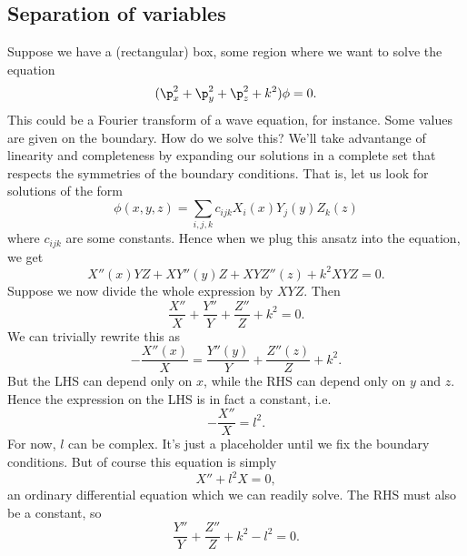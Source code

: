 \subsection*{Separation of variables}
\begin{exm}
    Suppose we have a (rectangular) box, some region where we want to solve the equation
    \begin{equation}
        (\p_x^2 + \p_y^2 + \p_z^2 + k^2)\phi =0.
    \end{equation}
    This could be a Fourier transform of a wave equation, for instance. Some values are given on the boundary. How do we solve this? We'll take advantange of linearity and completeness by expanding our solutions in a complete set that respects the symmetries of the boundary conditions. That is, let us look for  solutions of the form
    \begin{equation}
        \phi(x,y,z) = \sum_{i,j,k} c_{ijk} X_i(x) Y_j(y) Z_k(z)
    \end{equation}
    where $c_{ijk}$ are some constants. Hence when we plug this ansatz into the equation, we get
    \begin{equation}
        X''(x) YZ + XY''(y)Z + XYZ''(z) + k^2 XYZ = 0.
    \end{equation}
    Suppose we now divide the whole expression by $XYZ$. Then
    \begin{equation}
        \frac{X''}{X} + \frac{Y''}{Y} + \frac{Z''}{Z} + k^2 =0.
    \end{equation}
    We can trivially rewrite this as
    \begin{equation}
        -\frac{X''(x)}{X} = \frac{Y''(y)}{Y} + \frac{Z''(z)}{Z} + k^2.
    \end{equation}
    But the LHS can depend only on $x$, while the RHS can depend only on $y$ and $z$. Hence the expression on the LHS is in fact a constant, i.e.
    \begin{equation}
        -\frac{X''}{X} = l^2.
    \end{equation}
    For now, $l$ can be complex. It's just a placeholder until we fix the boundary conditions. But of course this equation is simply
    \begin{equation}
        X'' + l^2 X =0,
    \end{equation}
    an ordinary differential equation which we can readily solve. The RHS must also be a constant, so
    \begin{equation}
        \frac{Y''}{Y} +\frac{Z''}{Z} + k^2 - l^2 = 0.
    \end{equation}

\end{exm}
